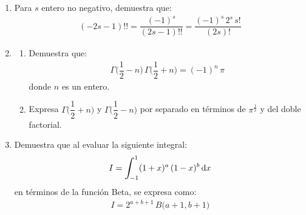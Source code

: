 \documentclass[hidelinks,12pt]{article}
\def\scaleint#1{\vcenter{\hbox{\scaleto[3ex]{\displaystyle\int}{#1}}}}
\def\bs{\mkern-12mu}
\begin{document}
\begin{enumerate}
\item Para $s$ entero no negativo, demuestra que:
\begin{align*}
(- 2 s - 1)!! = \dfrac{(-1)^{s}}{(2 s - 1)!!} = \dfrac{(-1)^{s} \, 2^{s} \, s!}{(2 s)!}
\end{align*}
\item \begin{enumerate}[label=\alph*)]
\item Demuestra que:
\begin{align*}
\Gamma \bigg( \dfrac{1}{2} - n \bigg) \, \Gamma \bigg( \dfrac{1}{2} + n \bigg) = (-1)^{n} \, \pi
\end{align*}
donde $n$ es un entero.
\item Expresa $\Gamma \bigg( \dfrac{1}{2} + n \bigg)$ y $\Gamma \bigg( \dfrac{1}{2} - n \bigg)$ por separado en términos de $\pi^{\frac{1}{2}}$ y del doble factorial.
\end{enumerate}
\item Demuestra que al evaluar la siguiente integral:
\begin{align*}
I = \scaleint{6ex}_{\bs -1}^{1} (1 + x)^{a} \, (1 - x)^{b} \dd{x}
\end{align*}
en términos de la función Beta, se expresa como:
\begin{align*}
I = 2^{a+b+1} \, B \big( a + 1, b + 1 \big)
\end{align*}
\end{enumerate}
\end{document}
